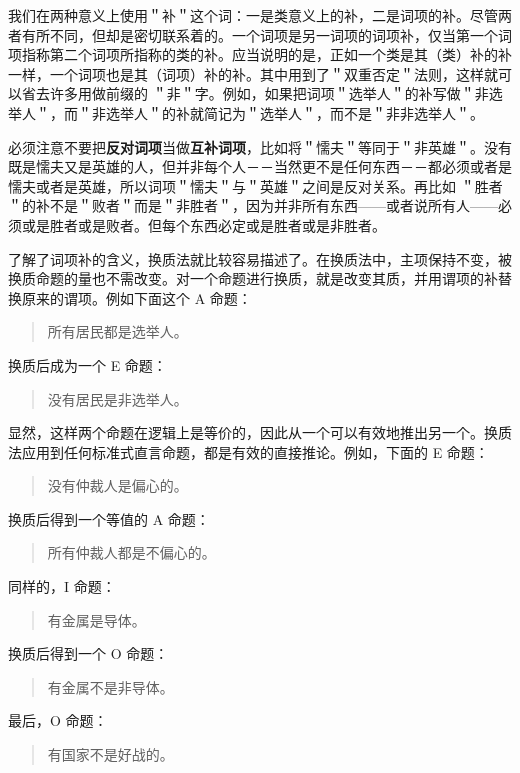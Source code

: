 我们在两种意义上使用＂补＂这个词：一是类意义上的补，二是词项的补。尽管两者有所不同，但却是密切联系着的。一个词项是另一词项的词项补，仅当第一个词项指称第二个词项所指称的类的补。应当说明的是，正如一个类是其（类）补的补一样，一个词项也是其（词项）补的补。其中用到了＂双重否定＂法则，这样就可以省去许多用做前缀的 ＂非＂字。例如，如果把词项＂选举人＂的补写做＂非选举人＂，而＂非选举人＂的补就简记为＂选举人＂，而不是＂非非选举人＂。

必须注意不要把\textbf{反对词项}当做\textbf{互补词项}，比如将＂懦夫＂等同于＂非英雄＂。没有既是懦夫又是英雄的人，但并非每个人－－当然更不是任何东西－－都必须或者是懦夫或者是英雄，所以词项＂懦夫＂与＂英雄＂之间是反对关系。再比如 ＂胜者＂的补不是＂败者＂而是＂非胜者＂，因为并非所有东西——或者说所有人——必须或是胜者或是败者。但每个东西必定或是胜者或是非胜者。

了解了词项补的含义，换质法就比较容易描述了。在换质法中，主项保持不变，被换质命题的量也不需改变。对一个命题进行换质，就是改变其质，并用谓项的补替换原来的谓项。例如下面这个 A 命题：

\begin{quote}
所有居民都是选举人。
\end{quote}

换质后成为一个 E 命题：

\begin{quote}
没有居民是非选举人。
\end{quote}

显然，这样两个命题在逻辑上是等价的，因此从一个可以有效地推出另一个。换质法应用到任何标准式直言命题，都是有效的直接推论。例如，下面的 E 命题：

\begin{quote}
没有仲裁人是偏心的。
\end{quote}

换质后得到一个等值的 A 命题：

\begin{quote}
所有仲裁人都是不偏心的。
\end{quote}

同样的，I 命题：

\begin{quote}
有金属是导体。
\end{quote}

换质后得到一个 O 命题：

\begin{quote}
有金属不是非导体。
\end{quote}

最后，O 命题：

\begin{quote}
有国家不是好战的。
\end{quote}

